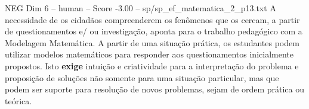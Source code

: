 \begin{textsample}{NEG Dim 6 – human – Score -3.00 – sp/sp\_ef\_matematica\_2\_p13.txt}  \label{ex:f6_neg_007}
A necessidade de os cidadãos compreenderem os fenômenos que os cercam, a partir de questionamentos e/ ou investigação, aponta para o trabalho pedagógico com a Modelagem Matemática.
A partir de uma situação prática, os estudantes podem utilizar modelos matemáticos para responder aos questionamentos inicialmente propostos.
Isto \textbf{exige} intuição e criatividade para a interpretação do problema e proposição de soluções não somente para uma situação particular, mas que podem ser suporte para resolução de novos problemas, sejam de ordem prática ou teórica.

\end{textsample}
